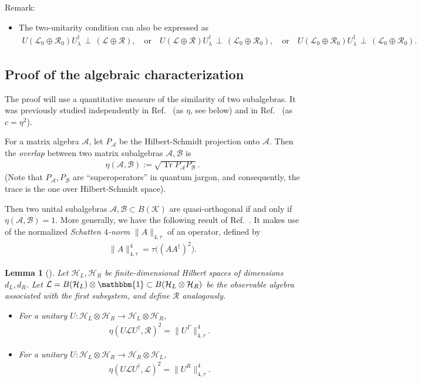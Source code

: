 \documentclass[aps,nofootinbib,floatfix,a4paper]{revtex4}
\newtheorem{lemma}[theorem]{Lemma}
\newcommand{\1}{\mbox{$\mathbf{1}$}}
\def\H{\mathcal{H}}
\def\A{\mathcal{A}}
\def\B{\mathcal{B}}
\def\K{\mathcal{K}}
\def\R{\mathcal{R}}
\def\Id{\mathbbm{1}}
\DeclareMathOperator{\Tr}{Tr}
\begin{document}
Remark:
\begin{itemize}
	\item
		The two-unitarity condition can also be expressed as
		\begin{align}\label{eqn:two_unitarity_direct_sum}
			U(\mathcal{L}_0 \oplus \R_0)U_\lambda^\dagger \,\perp\, (\mathcal{L} \oplus \R),
			\quad\text{or}\quad
			U(\mathcal{L} \oplus \R)U_\lambda^\dagger \,\perp\, (\mathcal{L}_0 \oplus \R_0),
			\quad\text{or}\quad
			U(\mathcal{L}_0 \oplus \R_0)U_\lambda^\dagger \,\perp\, (\mathcal{L}_0 \oplus \R_0)
			.
		\end{align}
\end{itemize}

\subsection{Proof of the algebraic characterization}
\label{sec:algebraic_proof}

The proof will use a quantitative measure of the similarity of two subalgebras.
It was previously studied independently in Ref.~\cite{gross2012index} (as $\eta$, see below) and in Ref.~\cite{weiner2010quasi} (as $c=\eta^2$).

For a matrix algebra $\A$, let $P_{\A}$ be the Hilbert-Schmidt projection onto $\A$.
Then the \emph{overlap} between two matrix subalgebras $\A, \B$ is
\begin{align*}
	\eta(\A,\B) := \sqrt{\Tr P_\A P_\B}.
\end{align*}
(Note that $P_\A, P_\B$ are ``superoperators'' in quantum jargon, and consequently, the trace is the one over Hilbert-Schmidt space).

Then two unital subalgebras $\A, \B\subset B(\K)$ are quasi-orthogonal if and only if $\eta(\A, \B)=1$.
More generally, we have the following result of Ref.~\cite[Section 7]{gross2012index}.
It makes use of the normalized \emph{Schatten $4$-norm} $\|A\|_{4,\tau}$ of an operator, defined by
\begin{align}\label{eqn:schatten_4}
	\|A\|_{4,\tau}^4 = 
	\tau\big(( A A^\dagger )^2\big).
\end{align}


\begin{lemma}[\cite{gross2012index}]\label{lem:overlaps}
	Let $\H_L, \H_R$ be finite-dimensional Hilbert spaces of dimensions $d_L, d_R$.
	Let $\mathcal{L}=B(\H_L)\otimes \Id \subset B(\H_L\otimes \H_R)$
	be the observable algebra associated with the first subsystem, and define $\R$ analogously.
	\begin{itemize}
		\item
			For a unitary $U: \H_L\otimes \H_R \to \H_L\otimes \H_R$,
			\begin{align*}
				\eta(U \mathcal{L} U^\dagger, \R)^2
				=
				\|U^\Gamma\|_{4,\tau}^4.
			\end{align*}
		\item
			For a unitary $U: \H_L\otimes \H_R \to \H_R\otimes \H_L$,
			\begin{align*}
				\eta(U \mathcal{L} U^\dagger, \mathcal{L})^2
				=
				\|U^R\|_{4,\tau}^4.
			\end{align*}
	\end{itemize}
\end{lemma}
\end{document}
